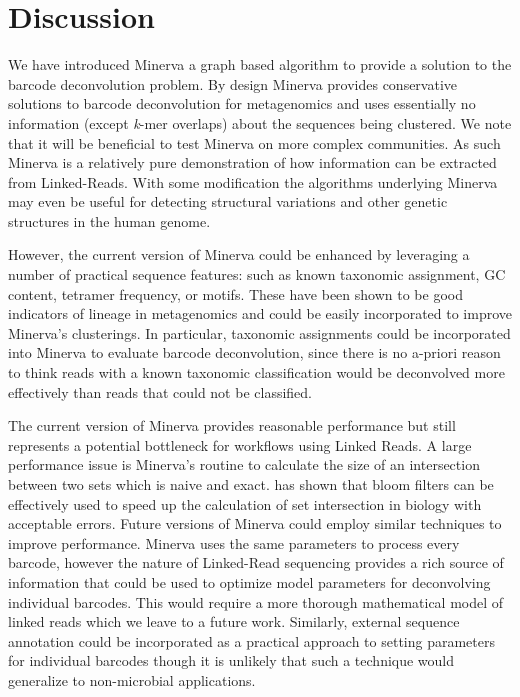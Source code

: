 \section*{Discussion}

We have introduced Minerva a graph based algorithm to provide a  solution to the barcode deconvolution problem. By design Minerva provides conservative solutions to barcode deconvolution for metagenomics and uses essentially no information (except \textit{k}-mer overlaps) about the sequences being clustered. We note that it will be beneficial to test Minerva on more complex communities. As such Minerva is a relatively pure demonstration of how information can be extracted from Linked-Reads. With some modification the algorithms underlying Minerva may even be useful for detecting structural variations and other genetic structures in the human genome.

However, the current version of Minerva could be enhanced by leveraging a number of practical sequence features: such as known taxonomic assignment, GC content, tetramer frequency, or motifs. These have been shown to be good indicators of lineage in metagenomics and could be easily incorporated to improve Minerva's clusterings. In particular, taxonomic assignments could be incorporated into Minerva to evaluate barcode deconvolution, since there is no a-priori reason to think reads with a known taxonomic classification would be deconvolved more effectively than reads that could not be classified. 

The current version of Minerva provides reasonable performance but still represents a potential bottleneck for workflows using Linked Reads. A large performance issue is Minerva's routine to calculate the size of an intersection between two sets which is naive and exact. \citep{Jain2017} has shown that bloom filters can be effectively used to speed up the calculation of set intersection in biology with acceptable errors. Future versions of Minerva could employ similar techniques to improve performance. Minerva uses the same parameters to process every barcode, however the nature of Linked-Read sequencing provides a rich source of information that could be used to optimize model parameters for deconvolving individual barcodes. This would require a more thorough mathematical model of linked reads which we leave to a future work. Similarly, external sequence annotation could be incorporated as a practical approach to setting parameters for individual barcodes though it is unlikely that such a technique would generalize to non-microbial applications.

